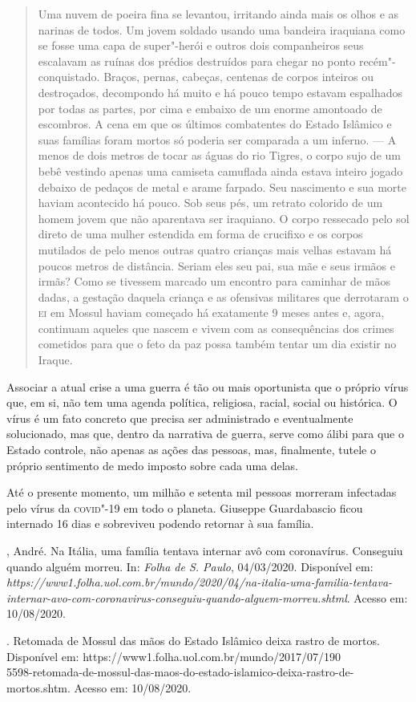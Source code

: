 \begin{quote}
Uma nuvem de poeira fina se levantou, irritando ainda mais os
olhos e as narinas de todos. Um jovem soldado usando uma bandeira
iraquiana como se fosse uma capa de super"-herói e outros dois
companheiros seus escalavam as ruínas dos prédios destruídos para chegar
no ponto recém"-conquistado. Braços, pernas, cabeças, centenas de corpos
inteiros ou destroçados, decompondo há muito e há pouco tempo estavam
espalhados por todas as partes, por cima e embaixo de um enorme
amontoado de escombros. A cena em que os últimos combatentes do Estado
Islâmico e suas famílias foram mortos só poderia ser comparada a um
inferno. --- A menos de dois metros de tocar as águas do rio Tigres, o
corpo sujo de um bebê vestindo apenas uma camiseta camuflada ainda
estava inteiro jogado debaixo de pedaços de metal e arame farpado. Seu
nascimento e sua morte haviam acontecido há pouco. Sob seus pés, um
retrato colorido de um homem jovem que não aparentava ser iraquiano. O
corpo ressecado pelo sol direto de uma mulher estendida em forma de
crucifixo e os corpos mutilados de pelo menos outras quatro crianças
mais velhas estavam há poucos metros de distância. Seriam eles seu pai,
sua mãe e seus irmãos e irmãs? Como se tivessem marcado um encontro para
caminhar de mãos dadas, a gestação daquela criança e as ofensivas
militares que derrotaram o \textsc{ei} em Mossul haviam começado há exatamente 9
meses antes e, agora, continuam aqueles que nascem e vivem com as
consequências dos crimes cometidos para que o feto da paz possa também
tentar um dia existir no Iraque.
\end{quote}

Associar a atual crise a uma guerra é tão ou mais oportunista que o
próprio vírus que, em si, não tem uma agenda política, religiosa,
racial, social ou histórica. O vírus é um fato concreto que precisa ser
administrado e eventualmente solucionado, mas que, dentro da narrativa
de guerra, serve como álibi para que o Estado controle, não apenas as
ações das pessoas, mas, finalmente, tutele o próprio sentimento de medo
imposto sobre cada uma delas.

Até o presente momento, um milhão e setenta mil pessoas morreram
infectadas pelo vírus da \textsc{covid}"-19 em todo o planeta. Giuseppe
Guardabascio ficou internado 16 dias e sobreviveu podendo retornar à sua
família.

\begin{bibliohedra}
, André. Na Itália, uma família tentava internar avô com
coronavírus. Conseguiu quando alguém morreu. In: \emph{Folha de S.
Paulo}, 04/03/2020. Disponível em:
\emph{https://www1.folha.uol.com.br/mundo/2020/04/na-italia-uma-familia-tentava-internar-avo-com-coronavirus-conseguiu-quando-alguem-morreu.shtml}.
Acesso em: 10/08/2020.

\titidem. Retomada de Mossul das mãos do Estado Islâmico deixa
rastro de mortos. Disponível em:
https://www1.folha.uol.com.br/mundo/2017/07/190\\5598-retomada-de-mossul-das-maos-do-estado-islamico-deixa-rastro-de-mortos.shtm.
Acesso em: 10/08/2020.
\end{bibliohedra}

